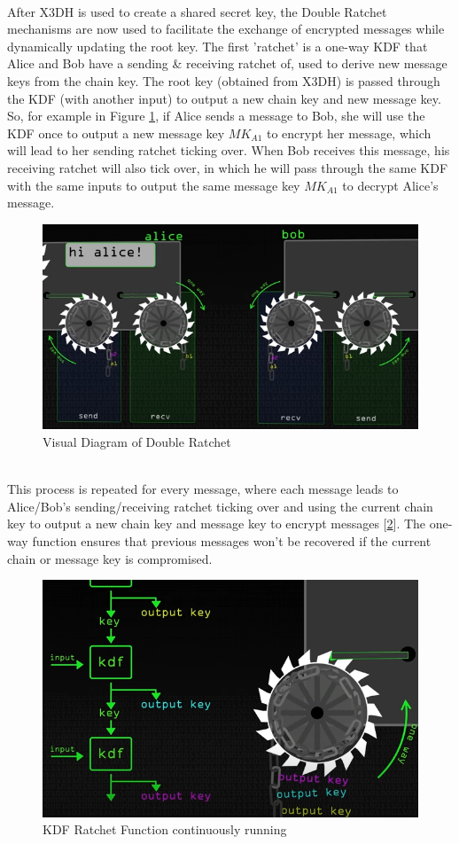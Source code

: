 \documentclass[11pt]{article}
\begin{document}
\\
After X3DH is used to create a shared secret key, the Double Ratchet mechanisms are now used to facilitate the exchange of encrypted messages while dynamically updating the root key. The first 'ratchet' is a one-way KDF that Alice and Bob have a sending \& receiving ratchet of, used to derive new message keys from the chain key. The root key (obtained from X3DH) is passed through the KDF (with another input) to output a new chain key and new message key. So, for example in Figure \ref{fig:DR_1}, if Alice sends a message to Bob, she will use the KDF once to output a new message key $MK_{A1}$ to encrypt her message, which will lead to her sending ratchet ticking over. When Bob receives this message, his receiving ratchet will also tick over, in which he will pass through the same KDF with the same inputs to output the same message key $MK_{A1}$ to decrypt Alice's message.
\begin{figure}
    \centering
    \includegraphics[width=1\linewidth]{images/image.png}
    \caption{Visual Diagram of Double Ratchet}
    \label{fig:DR_1}
\end{figure}
\\
This process is repeated for every message, where each message leads to Alice/Bob's sending/receiving ratchet ticking over and using the current chain key to output a new chain key and message key to encrypt messages [\ref{fig:DR_2}]. The one-way function ensures that previous messages won't be recovered if the current chain or message key is compromised.
\\
\begin{figure}
    \centering
    \includegraphics[width=1\linewidth]{images/DR_2.png}
    \caption{KDF Ratchet Function continuously running}
    \label{fig:DR_2}
\end{figure}
\end{document}
